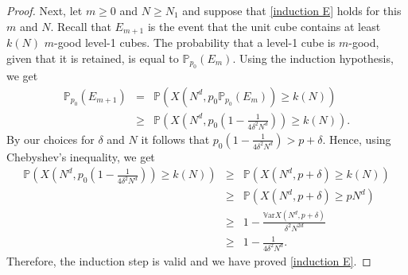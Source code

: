\documentclass[11pt,a4paper]{article}
\newcommand{\IV}{\ensuremath{\mathbb{V}}}
\newcommand{\IP}{\ensuremath{\mathbb{P}}}
\newcommand{\Var}{\ensuremath{\IV\text{ar}}}
\theoremstyle{remark}
\begin{document}
\begin{proof}
Next, let $m\geq 0$ and $N \geq N_1$ and suppose that \eqref{induction E} holds for this $m$ and $N$. Recall that $E_{m+1}$ is the event that the unit cube contains at least $k(N)$ $m$-good level-1 cubes. The probability that a level-1 cube is $m$-good, given that it is retained, is equal to $\IP_{p_0}(E_m)$. Using the induction hypothesis, we get
\begin{eqnarray*}
 \IP_{p_{0}}(E_{m+1}) &=& \IP(X(N^{d},p_{0}\IP_{p_{0}}(E_m)) \geq k(N)) \\
& \geq& \IP(X(N^d,p_0(1-\textstyle{\frac{1}{4 \delta^2 N^{d}}})) \geq k(N)). 
\end{eqnarray*}
By our choices for $\delta$ and $N$ it follows that $p_0(1-\frac{1}{4 \delta^2 N^{d}}) > p+\delta$. Hence, using Chebyshev's inequality, we get
\begin{eqnarray*}
\IP(X(N^d,p_0(1-\textstyle{\frac{1}{4 \delta^2 N^{d}}})) \geq k(N))
&\geq&\IP(X(N^d, p+\delta) \geq k(N)) \\
&\geq& \IP(X(N^d, p+ \delta) \geq pN^d) \\
&\geq& 1- \frac{\Var X(N^d,p+\delta)}{\delta^2 N^{2d}} \\
 &\geq& 1-  \frac{1}{4\delta^2N^{d}}.
\end{eqnarray*}
Therefore, the induction step is valid and we have proved \eqref{induction E}.
\end{proof}
\end{document}
